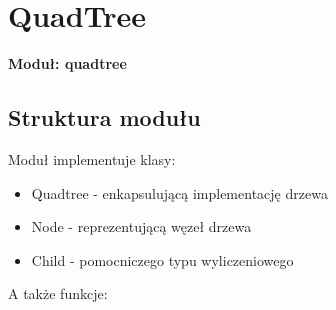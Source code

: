 \documentclass{article}
\begin{document}
    \section{QuadTree}
        \textbf{Moduł: quadtree}
        \subsection{Struktura modułu}
            Moduł implementuje klasy:
            \begin{itemize}
                \item Quadtree - enkapsulującą implementację drzewa
                \item Node - reprezentującą węzeł drzewa
                \item Child - pomocniczego typu wyliczeniowego
            \end{itemize}
            A także funkcje:
\end{document}
